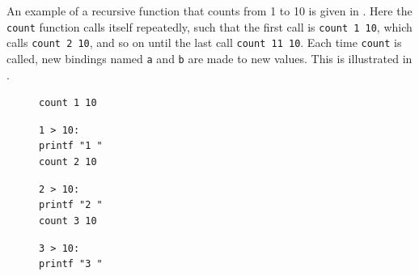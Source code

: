 \documentclass[fsharpNotes.tex]{subfiles}
\begin{document}
An example of a recursive function that counts from 1 to 10 is given in .
%
%
Here the \lstinline!count! function calls itself repeatedly, such that the first call is \lstinline!count 1 10!, which calls \lstinline!count 2 10!, and so on until the last call \lstinline!count 11 10!. Each time \lstinline{count} is called, new bindings named \lstinline{a} and \lstinline{b} are made to new values. This is illustrated in .
\begin{figure} %
  \begin{tcolorbox}[reset,valign lower=bottom,right=0.01\linewidth,squeezed title={\lstinline[language=console]{\$ fsharpc countRecursive.fsx \&\& mono countRecursive.exe}}]
    \lstinline{count 1 10}
    \begin{tcbraster}[raster columns=1,raster equal height,raster halign=right]
      \begin{tcolorbox}[valign lower=bottom,right=0.01\linewidth,squeezed title={\lstinline{count}$_1$: \lstinline{a}$_1$\lstinline{ = 1}, \lstinline{b}$_1$\lstinline{ = 10}}]
        \lstinline{1 > 10:} \xmark\\
        \hspace*{0.03\linewidth}\lstinline{printf "1 "}\\
        \hspace*{0.03\linewidth}\lstinline{count 2 10}
        \begin{tcbraster}[raster width=0.97\linewidth]
          \begin{tcolorbox}[valign lower=bottom,right=0.01\linewidth,squeezed title={\lstinline{count}$_2$: \lstinline{a}$_2$\lstinline{ = 2}, \lstinline{b}$_2$\lstinline{ = 10}}]
            \lstinline{2 > 10:} \xmark\\
            \hspace*{0.03\linewidth}\lstinline{printf "2 "}\\
            \hspace*{0.03\linewidth}\lstinline{count 3 10}
            \begin{tcbraster}[raster width=0.97\linewidth]
              \begin{tcolorbox}[valign lower=bottom,right=0.01\linewidth,squeezed title={\lstinline{count}$_3$: \lstinline{a}$_3$\lstinline{ = 3}, \lstinline{b}$_3$\lstinline{ = 10}}]
                \lstinline{3 > 10:} \xmark\\
                \hspace*{0.03\linewidth}\lstinline{printf "3 "}\\

\end{tcolorbox}
\end{tcbraster}
\end{tcolorbox}
\end{tcbraster}
\end{tcolorbox}
\end{tcbraster}
\end{tcolorbox}
\end{figure}
\end{document}
